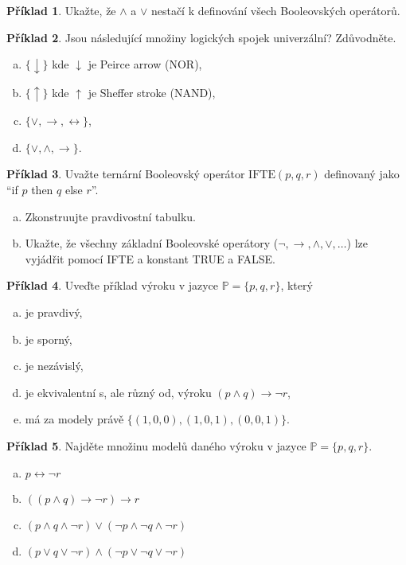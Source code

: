 \documentclass{amsart}
\theoremstyle{definition}
\newtheorem{problem}{Příklad}
\begin{document}
\smallskip
\begin{problem}
Ukažte, že $\wedge$ a $\vee$ nestačí k definování všech Booleovských operátorů.
\end{problem}

\smallskip
\begin{problem} Jsou následující množiny logických spojek univerzální? Zdůvodněte.
\begin{enumerate}[(a)]
    \item $\{\downarrow\}$ kde $\downarrow$ je Peirce arrow (NOR),
    \item $\{\uparrow\}$ kde $\uparrow$ je Sheffer stroke (NAND),
    \item $\{\vee, \rightarrow, \leftrightarrow\}$,
    \item $\{\vee, \wedge, \rightarrow\}$.
\end{enumerate}
\end{problem}

\smallskip
\begin{problem}
Uvažte ternární Booleovský operátor $\mathrm{IFTE}(p, q, r)$ definovaný jako ``if $p$ then $q$ else $r$''. 
\begin{enumerate}[(a)]
    \item Zkonstruujte pravdivostní tabulku.
    \item Ukažte, že všechny základní Booleovské operátory ($\neg, \to, \wedge,\vee,\dots$) lze vyjádřit pomocí IFTE a konstant TRUE a FALSE.
\end{enumerate}  
\end{problem}


\begin{problem}
Uveďte příklad výroku v jazyce $\mathbb P=\{p,q,r\}$, který
\begin{enumerate}[(a)]
\item je pravdivý,
\item je sporný,
\item je nezávislý,
\item je ekvivalentní s, ale různý od, výroku $(p\wedge q)\to\neg r$,
\item má za modely právě $\{(1,0,0),(1,0,1),(0,0,1)\}$.
\end{enumerate}
\end{problem}


\begin{problem}
Najděte množinu modelů daného výroku v jazyce $\mathbb P=\{p,q,r\}$.
\begin{enumerate}[(a)]
    \item $p\leftrightarrow \neg r$
    \item $((p\wedge q)\to\neg r)\to r$
    \item $(p\wedge q\wedge \neg r)\vee (\neg p\wedge \neg q\wedge \neg r)$
    \item $(p\vee q\vee \neg r)\wedge (\neg p\vee \neg q\vee \neg r)$
    
\end{enumerate}


\end{problem}
\end{document}
